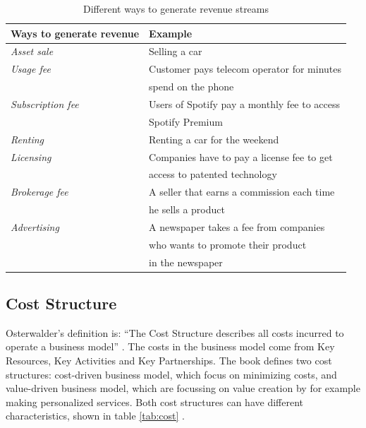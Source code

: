 \begin{table}
\centering
    \begin{tabular}{|l|l|}
        \hline
       \textbf{Ways to generate revenue} & \textbf{Example}  \\ \hline
       \emph{Asset sale} & Selling a car \\ \hline
       \emph{Usage fee} & Customer pays telecom operator for minutes \\ & spend on the phone \\ \hline
	 	\emph{Subscription fee} & Users of Spotify pay a monthly fee to access \\ & Spotify Premium \\ \hline
	   \emph{Renting} & Renting a car for the weekend \\ \hline
	   \emph{Licensing}	& Companies have to pay a license fee to get \\ & access to patented technology  \\ \hline
	   \emph{Brokerage fee}	& A seller that earns a commission each time \\ & he sells a product  \\ \hline
	   \emph{Advertising} & A newspaper takes a fee from companies \\ & who wants to promote their product \\ &in the newspaper \\ \hline
    \end{tabular}
    \caption[Different ways to generate revenue streams]{Different ways to generate revenue streams}
    \label{tab:revenue}
\end{table}

\subsection{Cost Structure}
Osterwalder’s definition is: “The Cost Structure describes all costs incurred to operate a business model” \cite{osterwalder}. The costs in the business model come from Key Resources, Key Activities and Key Partnerships. The book \cite{osterwalder} defines two cost structures: cost-driven business model, which focus on minimizing costs, and value-driven business model, which are focussing on value creation by for example making personalized services. Both cost structures can have different characteristics, shown in table \ref{tab:cost} \cite{osterwalder}.

